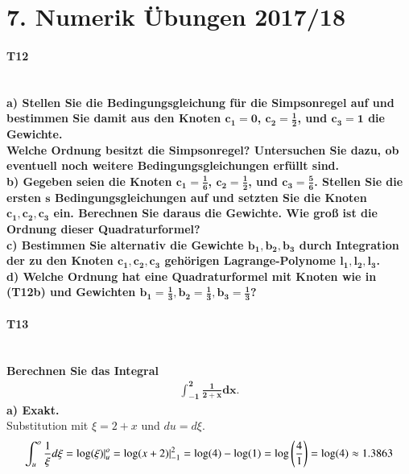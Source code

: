 \documentclass[10pt,a4paper]{article}
\begin{document}
	\section*{7. Numerik Übungen 2017/18}
	\paragraph{T12}\mbox{}\\
	\textbf{%
		a) Stellen Sie die Bedingungsgleichung für die Simpsonregel auf und bestimmen Sie damit aus den Knoten $\pmb{c_1=0}$, $\pmb{c_2=\frac{1}{2}}$, und $\pmb{c_3=1}$ die Gewichte.\\
        Welche Ordnung besitzt die Simpsonregel? Untersuchen Sie dazu, ob eventuell noch weitere Bedingungsgleichungen erfüllt sind.
	}\\
	
    
    
    \textbf{%
        b) Gegeben seien die Knoten $\pmb{c_1=\frac{1}{6}}$, $\pmb{c_2=\frac{1}{2}}$, und $\pmb{c_3=\frac{5}{6}}$. Stellen Sie die ersten $\pmb{s}$ Bedingungsgleichungen auf und setzten Sie die Knoten $\pmb{c_1, c_2, c_3}$ ein. Berechnen Sie daraus die Gewichte. Wie groß ist die Ordnung dieser Quadraturformel?
    }\\


    \textbf{%
        c) Bestimmen Sie alternativ die Gewichte $\pmb{b_1, b_2, b_3}$ durch Integration der zu den Knoten $\pmb{c_1, c_2, c_3}$ gehörigen Lagrange-Polynome $\pmb{l_1, l_2, l_3}$.
    }\\


    \textbf{%
        d) Welche Ordnung hat eine Quadraturformel mit Knoten wie in (T12b) und Gewichten $\pmb{b_1=\frac{1}{3}, b_2=\frac{1}{3}, b_3=\frac{1}{3}}$?
    }\\



    \pagebreak
    \paragraph{T13}\mbox{}\\
    \textbf{%
        Berechnen Sie das Integral
        \begin{align*}
            \pmb{\int_{-1}^{2}\frac{1}{2+x}dx}.
        \end{align*}
        a) Exakt.}\\
        Substitution mit $\xi=2+x$ und $du=d\xi$.
        \begin{align*}
            \int_{u}^{o}\frac{1}{\xi}d\xi = \text{log}(\xi)\arrowvert^o_u = \text{log}(x+2)\arrowvert^2_{-1} = \text{log}(4)-\text{log}(1) = \text{log}\left(\frac{4}{1}\right)=\text{log}(4)\approx1.3863
        \end{align*}
        
\end{document}
